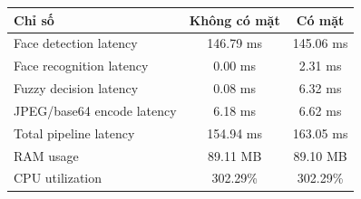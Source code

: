 \begin{tabular}{|l|c|c|}
\hline
\textbf{Chỉ số} & \textbf{Không có mặt} & \textbf{Có mặt} \\
\hline
Face detection latency & 146.79 ms & 145.06 ms \\
\hline
Face recognition latency & 0.00 ms & 2.31 ms \\
\hline
Fuzzy decision latency & 0.08 ms & 6.32 ms \\
\hline
JPEG/base64 encode latency & 6.18 ms & 6.62 ms \\
\hline
Total pipeline latency & 154.94 ms & 163.05 ms \\
\hline
RAM usage & 89.11 MB & 89.10 MB \\
\hline
CPU utilization & 302.29\% & 302.29\% \\
\hline
\end{tabular}
